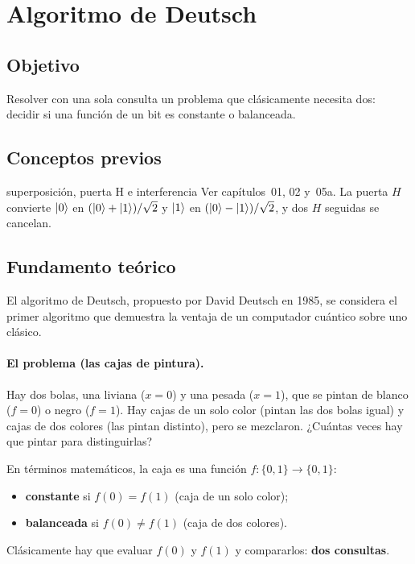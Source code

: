 \def\tituloconcepto{Algoritmo de Deutsch}


\section{Algoritmo de Deutsch}

\subsection{Objetivo}
Resolver con una sola consulta un problema que clásicamente necesita dos:
decidir si una función de un bit es constante o balanceada.

\subsection{Conceptos previos}
\begin{concepto}{superposición, puerta H e interferencia}
Ver capítulos~01, 02 y~05a. La puerta $H$ convierte $\left|0\right\rangle$ en
$(\left|0\right\rangle+\left|1\right\rangle)/\sqrt2$ y $\left|1\right\rangle$ en $(\left|0\right\rangle-\left|1\right\rangle)/\sqrt2$, y dos $H$ seguidas
se cancelan.
\end{concepto}

\subsection{Fundamento teórico}
El algoritmo de Deutsch, propuesto por David Deutsch en 1985, se considera el
primer algoritmo que demuestra la ventaja de un computador cuántico sobre uno
clásico.

\paragraph{El problema (las cajas de pintura).} Hay dos bolas, una liviana
($x=0$) y una pesada ($x=1$), que se pintan de blanco ($f=0$) o negro ($f=1$).
Hay cajas de un solo color (pintan las dos bolas igual) y cajas de dos colores
(las pintan distinto), pero se mezclaron. ¿Cuántas veces hay que pintar para
distinguirlas?

En términos matemáticos, la caja es una función $f:\{0,1\}\to\{0,1\}$:
\begin{itemize}
  \item \textbf{constante} si $f(0)=f(1)$ (caja de un solo color);
  \item \textbf{balanceada} si $f(0)\neq f(1)$ (caja de dos colores).
\end{itemize}
Clásicamente hay que evaluar $f(0)$ y $f(1)$ y compararlos: \textbf{dos consultas}.

